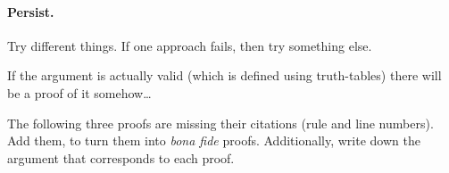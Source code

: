 \paragraph{Persist.}
Try different things. If one approach fails, then try something else.

If the argument is actually valid (which is defined using truth-tables) there will be a proof of it somehow\ldots



\begin{practiceproblems}

\problempart
The following three proofs are missing their citations (rule and line numbers). Add them, to turn them into \emph{bona fide} proofs. Additionally, write down the argument that corresponds to each proof.
\begin{multicols}{2}
\begin{fitchproof}
\end{fitchproof}

\begin{fitchproof}
\open
\close
{}
\end{fitchproof}

\end{multicols}

\solutions
\end{practiceproblems}



